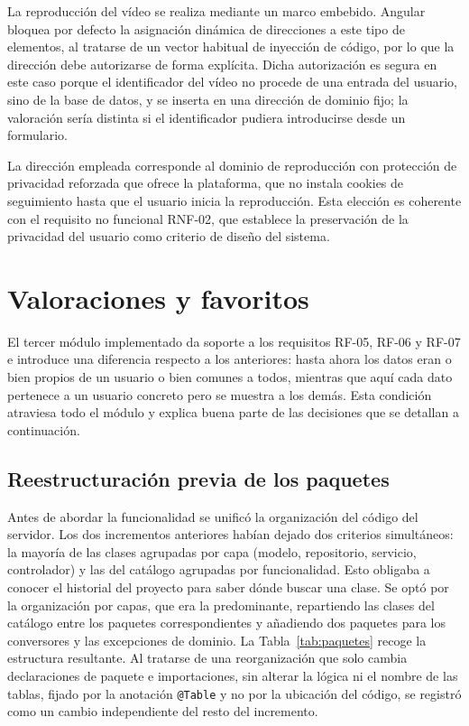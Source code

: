 \documentclass[12pt,a4paper,twoside,openright]{book}
\begin{document}
    La reproducción del vídeo se realiza mediante un marco embebido. Angular
    bloquea por defecto la asignación dinámica de direcciones a este tipo de
    elementos, al tratarse de un vector habitual de inyección de código, por lo
    que la dirección debe autorizarse de forma explícita. Dicha autorización es
    segura en este caso porque el identificador del vídeo no procede de una
    entrada del usuario, sino de la base de datos, y se inserta en una
    dirección de dominio fijo; la valoración sería distinta si el identificador
    pudiera introducirse desde un formulario.

    La dirección empleada corresponde al dominio de reproducción con protección
    de privacidad reforzada que ofrece la plataforma, que no instala cookies de
    seguimiento hasta que el usuario inicia la reproducción. Esta elección es
    coherente con el requisito no funcional RNF-02, que establece la
    preservación de la privacidad del usuario como criterio de diseño del
    sistema.

   \section{Valoraciones y favoritos}

    El tercer módulo implementado da soporte a los requisitos RF-05, RF-06 y
    RF-07 e introduce una diferencia respecto a los anteriores: hasta ahora los
    datos eran o bien propios de un usuario o bien comunes a todos, mientras que
    aquí cada dato pertenece a un usuario concreto pero se muestra a los demás.
    Esta condición atraviesa todo el módulo y explica buena parte de las
    decisiones que se detallan a continuación.

    \subsection{Reestructuración previa de los paquetes}

    Antes de abordar la funcionalidad se unificó la organización del código del
    servidor. Los dos incrementos anteriores habían dejado dos criterios simultáneos:
    la mayoría de las clases agrupadas por capa (modelo, repositorio, servicio, controlador)
    y las del catálogo agrupadas por funcionalidad. Esto obligaba a conocer el historial del proyecto para
    saber dónde buscar una clase. Se optó por la organización por capas, que era
    la predominante, repartiendo las clases del catálogo entre los paquetes
    correspondientes y añadiendo dos paquetes para los conversores y las
    excepciones de dominio. La Tabla~\ref{tab:paquetes} recoge la estructura
    resultante. Al tratarse de una reorganización que solo cambia declaraciones
    de paquete e importaciones, sin alterar la lógica ni el nombre de las tablas,
    fijado por la anotación \texttt{@Table} y no por la ubicación del código,
    se registró como un cambio independiente del resto del incremento.
\end{document}
